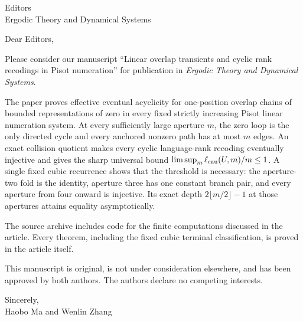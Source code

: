 \documentclass[11pt]{letter}
\begin{document}
\begin{letter}{Editors\\Ergodic Theory and Dynamical Systems}
\opening{Dear Editors,}

Please consider our manuscript ``Linear overlap transients and cyclic rank
recodings in Pisot numeration'' for publication in \emph{Ergodic Theory and
Dynamical Systems}.

The paper proves effective eventual acyclicity for one-position overlap
chains of bounded representations of zero in every fixed strictly increasing
Pisot linear numeration system.  At every sufficiently large aperture $m$,
the zero loop is the only directed cycle and every anchored nonzero path has
at most $m$ edges.  An exact collision quotient makes every cyclic
language-rank recoding eventually injective and gives the sharp universal
bound $\limsup_m\ell_{\rm cau}(U,m)/m\le1$.  A single fixed cubic recurrence
shows that the threshold is necessary: the aperture-two fold is the identity,
aperture three has one constant branch pair, and every aperture from four
onward is injective.  Its exact depth $2\lfloor m/2\rfloor-1$ at those
apertures attains equality asymptotically.

The source archive includes code for the finite computations discussed in
the article.  Every theorem, including the fixed cubic terminal
classification, is proved in the article itself.

This manuscript is original, is not under consideration elsewhere, and has
been approved by both authors.  The authors declare no competing interests.

\closing{Sincerely,\\Haobo Ma and Wenlin Zhang}
\end{letter}
\end{document}
